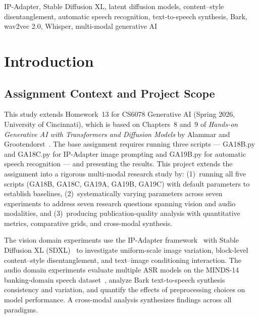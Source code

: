 \documentclass[conference]{IEEEtran}
\newcommand{\ipadapter}{IP-Adapter}
\newcommand{\sdxl}{SDXL}
\begin{document}
\begin{IEEEkeywords}
IP-Adapter, Stable Diffusion XL, latent diffusion models, content--style disentanglement, automatic speech recognition, text-to-speech synthesis, Bark, wav2vec 2.0, Whisper, multi-modal generative AI
\end{IEEEkeywords}

\section{Introduction}
\label{sec:intro}

\subsection{Assignment Context and Project Scope}

This study extends Homework~13 for CS6078 Generative AI (Spring 2026, University of Cincinnati), which is based on Chapters~8 and~9 of \textit{Hands-on Generative AI with Transformers and Diffusion Models} by Alammar and Grootendorst~\cite{alammar2024}. The base assignment requires running three scripts --- GA18B.py and GA18C.py for IP-Adapter image prompting and GA19B.py for automatic speech recognition --- and presenting the results. This project extends the assignment into a rigorous multi-modal research study by: (1)~running all five scripts (GA18B, GA18C, GA19A, GA19B, GA19C) with default parameters to establish baselines, (2)~systematically varying parameters across seven experiments to address seven research questions spanning vision and audio modalities, and (3)~producing publication-quality analysis with quantitative metrics, comparative grids, and cross-modal synthesis.

The vision domain experiments use the \ipadapter{} framework~\cite{ye2023ipadapter} with Stable Diffusion XL (\sdxl{})~\cite{podell2023sdxl} to investigate uniform-scale image variation, block-level content--style disentanglement, and text--image conditioning interaction. The audio domain experiments evaluate multiple ASR models on the MINDS-14 banking-domain speech dataset~\cite{gerz2021minds14}, analyze Bark text-to-speech synthesis~\cite{bark2023} consistency and variation, and quantify the effects of preprocessing choices on model performance. A cross-modal analysis synthesizes findings across all paradigms.
\end{document}
